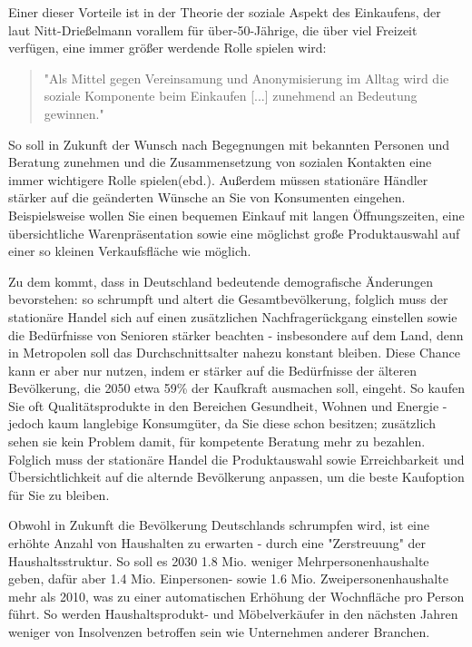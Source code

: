 \begin{folding}
Einer dieser Vorteile ist in der Theorie der soziale Aspekt des Einkaufens, der laut Nitt-Drießelmann vorallem für über-50-Jährige, die über viel Freizeit verfügen, eine immer größer werdende Rolle spielen wird\cite[S. 43f]{Nitt}:
\begin{quote}
"Als Mittel gegen Vereinsamung und Anonymisierung im Alltag wird die soziale Komponente beim Einkaufen [...] zunehmend an Bedeutung gewinnen."\cite[S. 43]{Nitt}
\end{quote} 
So soll in Zukunft der Wunsch nach Begegnungen mit bekannten Personen und Beratung zunehmen und die Zusammensetzung von sozialen Kontakten eine immer wichtigere Rolle spielen(ebd.).
Außerdem müssen stationäre Händler stärker auf die geänderten Wünsche an Sie von Konsumenten eingehen. Beispielsweise wollen Sie einen bequemen Einkauf mit langen Öffnungszeiten, eine übersichtliche Warenpräsentation sowie eine möglichst große Produktauswahl auf einer so kleinen Verkaufsfläche wie möglich\cite[S. 61]{Nitt}.

Zu dem kommt, dass in Deutschland bedeutende demografische Änderungen bevorstehen: so schrumpft und altert die Gesamtbevölkerung, folglich muss der stationäre Handel sich auf einen zusätzlichen Nachfragerückgang einstellen sowie die Bedürfnisse von Senioren stärker beachten - insbesondere auf dem Land, denn in Metropolen soll das Durchschnittsalter nahezu konstant bleiben\cite[S. 32ff]{Nitt}. Diese Chance kann er aber nur nutzen, indem er stärker auf die Bedürfnisse der älteren Bevölkerung, die 2050 etwa 59\% der Kaufkraft ausmachen soll, eingeht\cite[S. 64]{Nitt}. So kaufen Sie oft Qualitätsprodukte in den Bereichen Gesundheit, Wohnen und Energie - jedoch kaum langlebige Konsumgüter, da Sie diese schon besitzen; zusätzlich sehen sie kein Problem damit, für kompetente Beratung mehr zu bezahlen\cite[S. 41f]{Nitt}. Folglich muss der stationäre Handel die Produktauswahl sowie Erreichbarkeit und Übersichtlichkeit auf die alternde Bevölkerung anpassen, um die beste Kaufoption für Sie zu bleiben\cite[S. 64]{Nitt}.

Obwohl in Zukunft die Bevölkerung Deutschlands schrumpfen wird, ist eine erhöhte Anzahl von Haushalten zu erwarten - durch eine "Zerstreuung" der Haushaltsstruktur. So soll es 2030 1.8 Mio. weniger Mehrpersonenhaushalte geben, dafür aber 1.4 Mio. Einpersonen- sowie 1.6 Mio. Zweipersonenhaushalte mehr als 2010\cite[S. 35]{Nitt}, was zu einer automatischen Erhöhung der Wochnfläche pro Person führt. So werden Haushaltsprodukt- und Möbelverkäufer in den nächsten Jahren weniger von Insolvenzen betroffen sein wie Unternehmen anderer Branchen.


\end{folding}
